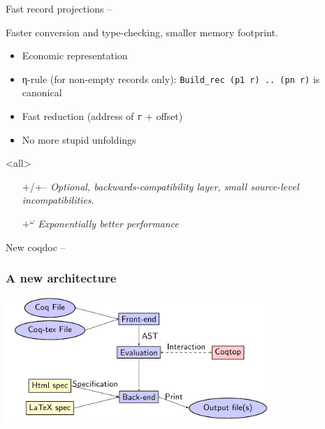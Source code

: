 
\begin{subsecframefragile}{Fast record projections -- }

  \begin{center}
    Faster conversion and type-checking, smaller memory
    footprint.
  \end{center}
  
  \begin{itemize}
  \item Economic representation
  \item η-rule (for non-empty records only): 
    \verb|Build_rec (p1 r) .. (pn r)| is canonical
  \item Fast reduction (address of \verb|r| + offset)
  \item<article> No more stupid unfoldings
  \end{itemize}
  \mode<all>
    
  \begin{itemize}
  \item[+/+--] \emph{Optional, backwards-compatibility layer,
      small source-level incompatibilities}.
  \item[${+}^{ω}$] \emph{Exponentially better performance}
  \end{itemize}

\end{subsecframefragile}

\begin{subsecframefragile}{New coqdoc -- }
\frametitle{A new architecture}
\begin{center}
\includegraphics[width=10cm]{coqdoc.png}
\end{center}
\end{subsecframefragile}

